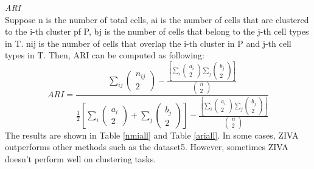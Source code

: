 \vspace{0.5cm}
\noindent\emph{ARI} \\
Suppose n is the number of total cells, ai is the number of cells that are clustered to the i-th cluster pf P, bj is the number of cells that belong to the j-th cell types in T. nij is the number of cells that overlap the i-th cluster in P and j-th cell types in T. Then, ARI can be computed as following:
\begin{equation}
    ARI = \frac{\sum_{i j}\left(\begin{array}{c}n_{i j} \\ 2\end{array}\right)-\frac{\left[\sum_{i}\left(\begin{array}{c}a_{i} \\ 2\end{array}\right) \sum_{j}\left(\begin{array}{c}b_{j} \\ 2\end{array}\right)\right]}{\left(\begin{array}{l}n \\ 2\end{array}\right)}}{\frac{1}{2}\left[\sum_{i}\left(\begin{array}{c}a_{i} \\ 2\end{array}\right)+\sum_{j}\left(\begin{array}{c}b_{j} \\ 2\end{array}\right)\right]-\frac{\left[\sum_{i}\left(\begin{array}{c}a_{i} \\ 2\end{array}\right) \sum_{j}\left(\begin{array}{c}b_{j} \\ 2\end{array}\right)\right]}{\left(\begin{array}{l}n \\ 2\end{array}\right)}}
\end{equation}
The results are shown in Table \ref{nmiall} and Table \ref{ariall}. In some cases, ZIVA outperforms other methods such as the dataset5. However, sometimes ZIVA doesn't perform well on clustering tasks.
